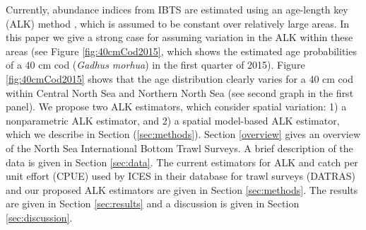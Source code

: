 \documentclass[a4paper 12pt]{article}
\numberwithin{equation}{section}
\begin{document}
Currently, abundance indices from  IBTS are estimated using an age-length key (ALK) method \citep{fridriksson1934calculation}, which is assumed to be constant  over relatively large areas. In this paper we give a strong case for assuming variation in the ALK within these areas (see Figure \ref{fig:40cmCod2015}, which shows the estimated age probabilities of a 40 cm cod (\emph{Gadhus morhua}) in the first quarter of 2015). Figure \ref{fig:40cmCod2015} shows that the age distribution clearly varies for a 40 cm cod within Central North Sea and Northern North Sea (see second graph in the first panel). We propose two ALK estimators, which consider spatial variation: 1) a nonparametric  ALK estimator, and 2) a spatial model-based ALK estimator, which we describe in Section (\ref{sec:methods}). Section \ref{overview} gives an  overview of the  North Sea International Bottom Trawl Surveys. A brief description of the data is given in Section \ref{sec:data}. The current estimators for ALK and catch per unit effort (CPUE) used by ICES in their database for trawl surveys (DATRAS) and our proposed ALK estimators are given in Section \ref{sec:methods}. The results are given in Section \ref{sec:results} and a discussion is given in Section \ref{sec:discussion}.
\end{document}
